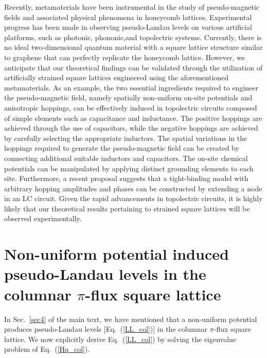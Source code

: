 \documentclass[aps, twocolumn, floatfix, superscriptaddress, prb]{revtex4-1}
\begin{document}
Recently, metamaterials have been instrumental in the study of pseudo-magnetic fields and associated physical phenomena in honeycomb lattices. Experimental progress has been made in observing pseudo-Landau levels on various artificial platforms\cite{PhysRevLett.127.136401,RN60,PhysRevB.88.115437,RN62}, such as photonic\cite{RN61,RN63,RN64}, phononic\cite{doi:10.1073/pnas.1615503114,RN59,PhysRevLett.118.194301},and topolectric\cite{PhysRevLett.124.046401,teo2023pseudomagnetic} systems. Currently, there is no ideal two-dimensional quantum material with a square lattice structure similar to graphene that can perfectly replicate the honeycomb lattice. However, we anticipate that our theoretical findings can be validated through the utilization of artificially strained square lattices engineered using the aforementioned metamaterials. As an example, the two essential ingredients required to engineer the pseudo-magnetic field, namely spatially non-uniform on-site potentials and anisotropic hoppings, can be effectively induced in topolectric circuits composed of simple elements such as capacitance and inductance\cite{PhysRevLett.122.247702,PhysRevResearch.3.023056}. The positive hoppings are achieved through the use of capacitors, while the negative hoppings are achieved by carefully selecting the appropriate inductors. The spatial variations in the hoppings required to generate the pseudo-magnetic field can be created by connecting additional suitable inductors and capacitors. The on-site chemical potentials can be manipulated by applying distinct grounding elements to each site. Furthermore, a recent proposal suggests that a tight-binding model with arbitrary hopping amplitudes and phases can be constructed by extending a node in an LC circuit\cite{PhysRevResearch.3.023056}. Given the rapid advancements in topolectric circuits, it is highly likely that our theoretical results pertaining to strained square lattices will be observed experimentally.



\appendix

\section{{Non-uniform potential induced pseudo-Landau levels in the columnar $\pi$-flux square lattice}}
\label{a1}
In Sec.~\ref{sec4} of the main text, we have mentioned that a non-uniform potential produces pseudo-Landau levels [Eq.~(\ref{LL_col})] in the columnar $\pi$-flux square lattice. We now explicitly derive Eq.~(\ref{LL_col}) by solving the eigenvalue problem of Eq.~(\ref{Hq_col}).
\end{document}
